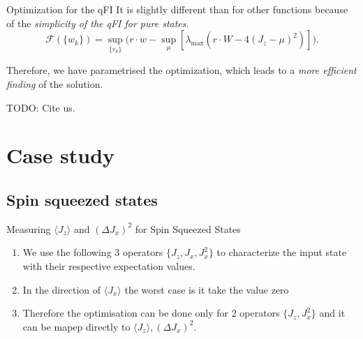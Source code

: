 \documentclass{beamer}
\newcommand{\expect}[1]{\ensuremath{\langle #1 \rangle}}
\newcommand{\varian}[1]{\ensuremath{\left(\Delta #1 \right)^2}}
\begin{document}
		\begin{frame}
			\begin{block}
				{Optimization for the qFI}
				It is slightly different than for other functions because of the \emph{\color{blue} simplicity of the qFI for pure states}.
				{\small
				\[
				\mathcal{F}(\{w_k\}) = \sup_{\{r_k\}} \big( r\cdot w - \sup_{\mu} [ \lambda_{\max} ( r\cdot W - 4(J_z-\mu)^2 ) ] \big).
				\]}
			\end{block}

			Therefore, we have parametrised the optimization, which leads to a \emph{more efficient finding} of the solution.

			TODO: Cite us.

		\end{frame}

\section{Case study}

		\begin{frame}
			\tableofcontents[currentsection]

		\end{frame}

		\begin{frame}


		\end{frame}

	\subsection{Spin squeezed states}

		\begin{frame}
			{Measuring $\expect{J_z}$ and $\varian{J_x}$ for Spin Squeezed States}

			\begin{enumerate}
				\item We use the following 3 operators $\{ J_z,J_x,J_x^2 \}$ to characterize the input state with their respective expectation values.
				\item In the direction of $\expect{J_x}$ the worst case is it take the value zero
				\item Therefore the optimisation can be done only for 2 operators $\{ J_z,J_x^2 \}$ and it can be mapep directly to $\expect{J_z},\varian{J_x}$.

			\end{enumerate}

		\end{frame}
\end{document}
